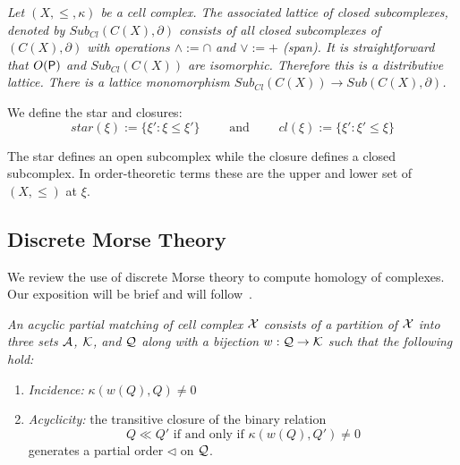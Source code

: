 \begin{ex}
{\em
Let $(X,\leq,\kappa)$ be a cell complex.  The associated {\em lattice of closed subcomplexes}, denoted by $Sub_{Cl}(C(X),\partial)$ consists of all closed subcomplexes of $(C(X),\partial)$ with operations $\wedge:= \cap$ and $\vee := +$ (span).  It is straightforward that $O({\mathsf P})$ and $Sub_{Cl}(C(X))$ are isomorphic.  Therefore this is a distributive lattice.  There is a lattice monomorphism $Sub_{Cl}(C(X))\to Sub(C(X),\partial)$.
}
\end{ex}

We define the star and closures: 
\[
star(\xi):= \{\xi': \xi \leq \xi'\}\quad\quad \text{ and } \quad\quad cl(\xi) := \{\xi':\xi'\leq \xi\}
\]

The star defines an open subcomplex while the closure defines a closed subcomplex.  In order-theoretic terms these are the upper and lower set of $(X,\leq)$ at $\xi$.





\subsection{Discrete Morse Theory}
We review the use of discrete Morse theory to compute homology of complexes. Our exposition will be brief and will follow~\cite{focm}.

\begin{defn}
{\em
An {\em acyclic partial matching} of cell complex ${\mathcal X}$ consists of a partition of ${\mathcal X}$ into three sets ${\mathcal A}$, ${\mathcal K}$, and ${\mathcal Q}$ along with a bijection $w:{\mathcal Q}\to {\mathcal K}$ such that the following hold:
 \begin{enumerate}
 \item {\em Incidence:} $\kappa(w(Q),Q)\neq 0$
 \item {\em Acyclicity:} the transitive closure of the binary relation $$Q \ll Q' \text{ if and only if } \kappa (w(Q),Q')\neq 0$$
 generates a partial order $\lhd$ on ${\mathcal Q}$.
 \end{enumerate}
 }
 \end{defn} 
 
